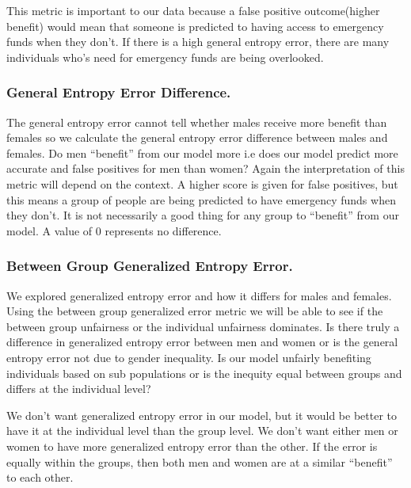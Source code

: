 \documentclass[water,article,submit,moreauthors,pdftex]{mdpi}
\begin{document}
This metric is important to our data because a false positive
outcome(higher benefit) would mean that someone is predicted to having
access to emergency funds when they don't. If there is a high general
entropy error, there are many individuals who's need for emergency funds
are being overlooked.

\hypertarget{general-entropy-error-difference.}{%
\subsubsection{General Entropy Error
Difference.}\label{general-entropy-error-difference.}}

The general entropy error cannot tell whether males receive more benefit
than females so we calculate the general entropy error difference
between males and females. Do men ``benefit'' from our model more i.e
does our model predict more accurate and false positives for men than
women? Again the interpretation of this metric will depend on the
context. A higher score is given for false positives, but this means a
group of people are being predicted to have emergency funds when they
don't. It is not necessarily a good thing for any group to ``benefit''
from our model. A value of 0 represents no difference.

\hypertarget{between-group-generalized-entropy-error.}{%
\subsubsection{Between Group Generalized Entropy
Error.}\label{between-group-generalized-entropy-error.}}

We explored generalized entropy error and how it differs for males and
females. Using the between group generalized error metric we will be
able to see if the between group unfairness or the individual unfairness
dominates. Is there truly a difference in generalized entropy error
between men and women or is the general entropy error not due to gender
inequality. Is our model unfairly benefiting individuals based on sub
populations or is the inequity equal between groups and differs at the
individual level?

We don't want generalized entropy error in our model, but it would be
better to have it at the individual level than the group level. We don't
want either men or women to have more generalized entropy error than the
other. If the error is equally within the groups, then both men and
women are at a similar ``benefit'' to each other.
\end{document}
